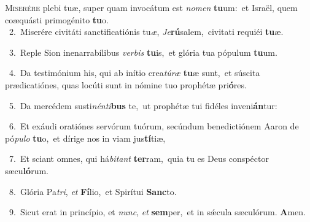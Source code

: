 \lettrine{\initial\textcolor{\initialcolor}{M}}{iserére} plebi tuæ, super quam invocátum est \textit{no}\-\textit{men} \textbf{tu}\-um:~\star et Israël, quem coæquásti primogénito \textbf{tu}\-o.\\
{\numbfont\textcolor{\numbcolor}{~2.}}~Miserére civitáti sanctificatiónis tu\-\textit{æ}\-, \textit{Je}\-\textbf{rú}salem,~\star civitati requiéi \textbf{tu}\-æ.\par
{\numbfont\textcolor{\numbcolor}{~3.}}~Reple Sion inenarrabílibus \textit{ver}\-\textit{bis} \textbf{tu}\-is,~\star et glória tua pópulum \textbf{tu}\-um.\par
{\numbfont\textcolor{\numbcolor}{~4.}}~Da testimónium his, qui ab inítio crea\-\textit{tú}\-\textit{ræ} \textbf{tu}\-æ sunt,~\star et súscita prædicatiónes, quas locúti sunt in nómine tuo prophétæ pri\-\textbf{ó}\-res.\par
{\numbfont\textcolor{\numbcolor}{~5.}}~Da mercédem susti\-\textit{nén}\-\textit{ti}\textbf{bus} te,~\star ut prophétæ tui fidéles inveni\-\textbf{án}\-tur:\par
{\numbfont\textcolor{\numbcolor}{~6.}}~Et exáudi oratiónes servórum tuórum, secúndum benedictiónem Aaron de pó\-\textit{pu}\-\textit{lo} \textbf{tu}\-o,~\star et dírige nos in viam jus\-\textbf{tí}\-tiæ,\par
{\numbfont\textcolor{\numbcolor}{~7.}}~Et sciant omnes, qui há\-\textit{bi}\-\textit{tant} \textbf{ter}\-ram,~\star quia tu es Deus conspéctor sæcu\-\textbf{ló}\-rum.\par
{\numbfont\textcolor{\numbcolor}{~8.}}~Glória Pa\-\textit{tri}\-, \textit{et} \textbf{Fí}\-lio,~\star et Spirítui \textbf{Sanc}\-to.\par
{\numbfont\textcolor{\numbcolor}{~9.}}~Sicut erat in princípio, et \textit{nunc}\-, \textit{et} \textbf{sem}\-per,~\star et in sǽcula sæculórum. \textbf{A}\-men.\par
